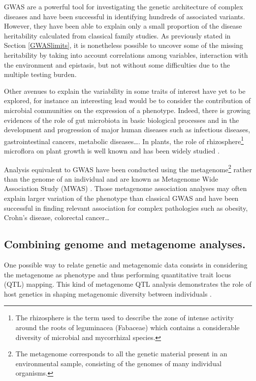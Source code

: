 \documentclass[]{book}
\begin{document}
GWAS are a powerful tool for investigating the genetic architecture of
complex diseases and have been successful in identifying hundreds of
associated variants. However, they have been able to explain only a
small proportion of the disease heritability calculated from classical
family studies. As previously stated in Section \ref{GWASlimits},
it is nonetheless possible to uncover some of the missing heritability
by taking into account correlations among variables, interaction with
the environment and epistasis, but not without some difficulties due to
the multiple testing burden.

Other avenues to explain the variability in some traits of interest have
yet to be explored, for instance an interesting lead would be to
consider the contribution of microbial communities on the expression of
a phenotype. Indeed, there is growing evidences of the role of gut
microbiota in basic biological processes and in the development and
progression of major human diseases such as infectious diseases,
gastrointestinal cancers, metabolic diseases\ldots{}\citep{wang_2107_human}. In
plants, the role of rhizosphere\footnote{The rhizosphere is the term used to describe the zone of intense
  activity around the roots of leguminacea (Fabaceae) which contains a
  considerable diversity of microbial and mycorrhizal species.} microflora on plant growth is well
known and has been widely studied
\citep{mukerji2002techniques, pinton2007rhizosphere}.

Analysis equivalent to GWAS have been conducted using the metagenome\footnote{The metagenome corresponds to all the genetic material present in
  an environmental sample, consisting of the genomes of many
  individual organisms.}
rather than the genome of an individual and are known as Metagenome Wide
Association Study (MWAS) \citep{wang2016metagenome, segata2011metagenomic}.
Those metagenome association analyses may often explain larger variation
of the phenotype than classical GWAS and have been successful in finding
relevant association for complex pathologies such as obesity, Crohn's
disease, colorectal cancer\ldots{}

\hypertarget{combining-genome-and-metagenome-analyses.}{%
\subsection{Combining genome and metagenome analyses.}\label{combining-genome-and-metagenome-analyses.}}

One possible way to relate genetic and metagenomic data consists in
considering the metagenome as phenotype and thus performing quantitative
trait locus (QTL) mapping. This kind of metagenome QTL analysis
demonstrates the role of host genetics in shaping metagenomic diversity
between individuals \citep{wang2016genome, srinivas2013genome}.
\end{document}

